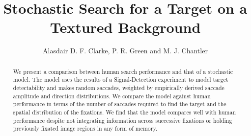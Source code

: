 \documentclass[a4paper,twoside,10pt,twocolumn]{article}
\begin{document}
\pagestyle{empty} %



\title{Stochastic Search for a Target on a Textured Background}
\author{Alasdair D. F. Clarke, P. R. Green and M. J. Chantler}


\maketitle
\begin{abstract}
We present a comparison between human search performance and that of a stochastic model. The model uses the results of a Signal-Detection experiment to model target detectability and makes random saccades, weighted by empirically derived saccade amplitude and direction distributions. We compare the model against human performance in terms of the number of saccades required to find the target and the spatial distribution of the fixations. We find that the model compares well with human performance despite not integrating information across successive fixations or holding previously fixated image regions in any form of memory. 
\end{abstract}



\pagestyle{plain} %















\clearpage
{}
\listoffigures



\appendix

\end{document}
